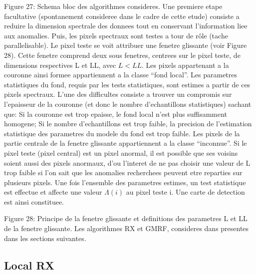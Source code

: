 Figure 27: Schema bloc des algorithmes consideres.  Une premiere etape
facultative (spontanement consideree dans le cadre de cette etude)
consiste a reduire la dimension spectrale des donnees tout en
conservant l'information liee aux anomalies. Puis, les pixels
spectraux sont testes a tour de rôle (tache parallelisable). Le pixel
teste se voit attribuer une fenetre glissante (voir Figure 28). Cette
fenetre comprend deux sous fenetres, centrees sur le pixel teste, de
dimensions respectives L et LL, avec $L < LL$.  Les pixels appartenant a
la couronne ainsi formee appartiennent a la classe ``fond local''. Les
parametres statistiques du fond, requis par les tests statistiques,
sont estimes a partir de ces pixels spectraux. L'une des difficultes
consiste a trouver un compromis sur l'epaisseur de la couronne (et
donc le nombre d'echantillons statistiques) sachant que: Si la
couronne est trop epaisse, le fond local n'est plus suffisamment
homogene; Si le nombre d'echantillons est trop faible, la precision
de l'estimation statistique des parametres du modele du fond est trop
faible.  Les pixels de la partie centrale de la fenetre glissante
appartiennent a la classe ``inconnue''. Si le pixel teste (pixel
central) est un pixel anormal, il est possible que ses voisins soient
aussi des pixels anormaux, d'ou l'interet de ne pas choisir une valeur
de L trop faible si l'on sait que les anomalies recherchees peuvent
etre reparties sur plusieurs pixels.  Une fois l'ensemble des
parametres estimes, un test statistique est effectue et affecte une
valeur $\Lambda(i)$ au pixel teste i. Une carte de detection est ainsi
constituee.

Figure 28: Principe de la fenetre glissante et definitions des
parametres L et LL de la fenetre glissante.  Les algorithmes RX et
GMRF, consideres dans presentes dans les sections suivantes.

\subsection{Local RX}
